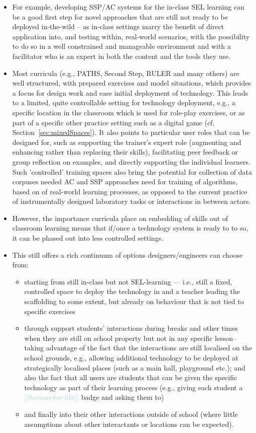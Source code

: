 \documentclass[prodmode,acmtochi]{acmsmall}
\newcommand{\todo}[1]{\textrm{\textrm{\textcolor{LightBlue}{[[#1]]} } } }
\begin{document}
\begin{itemize}
	\item For example, developing SSP/AC systems for the in-class SEL learning  can be a good first step for novel approaches that are still not ready to be deployed in-the-wild -- as in-class settings marry the benefit of direct application into, and testing within, real-world scenarios, with the possibility to do so in a well constrained and manageable environment and with a facilitator who is an expert in both the content and the tools they use.
	
	\item Most curricula (e.g., PATHS, Second Step, RULER and many others) are well structured, with prepared exercises and model situations, which provides a focus for design work and ease initial deployment of technology. This leads to a limited, quite controllable setting for technology deployment, e.g., a specific location in the classroom which is used for role-play exercises, or as part of a specific other practice setting such as a digital game (cf. Section~\ref{sec:mixedSpaces}). It also points to particular user roles that can be designed for, such as supporting the trainer's expert role (augmenting and enhancing rather than replacing their skills), facilitating peer feedback or group reflection on examples, and directly supporting the individual learners. 
 Such 'controlled' training spaces also bring the potential for collection of data corpuses needed AC and SSP approaches need for training of algorithms, based on of real-world learning processes, as opposed to the current practice of instrumentally designed laboratory tasks or interactions in between actors.  
\medskip

	\item However, the importance curricula place on embedding of skills out of classroom learning means that if/once a technology system is ready to to so, it can be phased out into less controlled settings. 
	\item This still offers a rich continuum of options designers/engineers can choose from: 
	\begin{itemize}
		\item starting from still in-class but not SEL-learning --- i.e., still a fixed, controlled space to deploy the technology in and a teacher leading the scaffolding to some extent, but already on behaviour that is not tied to specific exercises 
		\item through support students' interactions during breaks and other times when they are still on school property but not in any specific lesson-- taking advantage of the fact that the interactions are still localised on the school grounds, e.g., allowing additional technology to be deployed at strategically localised places (such as a main hall, playground etc.); and also the fact that all users are students that can be given the specific technology as part of their learning process (e.g., giving each student a \todo{Sociometer-like} badge and asking them to)
		\item and finally into their other interactions outside of school (where little assumptions about other interactants or locations can be expected).
	\end{itemize} \medskip


\end{itemize}
\end{document}
